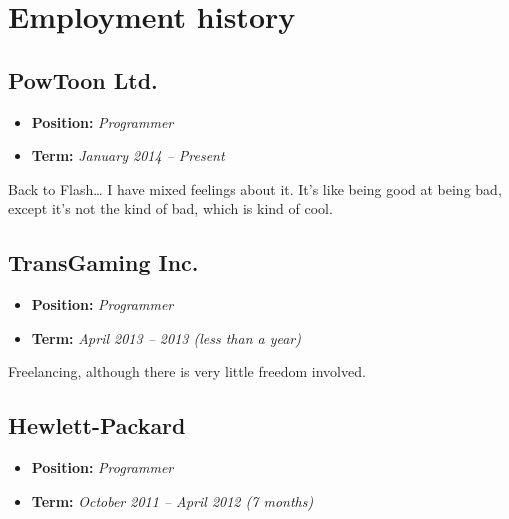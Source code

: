 \documentclass[oneside]{memoir}
\begin{document}
\mainmatter
\chapter{Employment history}
\label{sec-3}

\section{PowToon Ltd.}
\label{sec-3-1}
\begin{itemize}
\item \textbf{Position:} \emph{Programmer}
\item \textbf{Term:} \emph{January 2014 – Present}
\end{itemize}

Back to Flash\ldots{} I have mixed feelings about it. It's like being
good at being bad, except it's not the kind of bad, which is kind of
cool.
\section{TransGaming Inc.}
\label{sec-3-2}
\begin{itemize}
\item \textbf{Position:} \emph{Programmer}
\item \textbf{Term:} \emph{April 2013 – 2013 (less than a year)}
\end{itemize}

Freelancing, although there is very little freedom involved.
\section{Hewlett-Packard}
\label{sec-3-3}
\begin{itemize}
\item \textbf{Position:} \emph{Programmer}
\item \textbf{Term:} \emph{October 2011 – April 2012 (7 months)}
\end{itemize}
\end{document}
